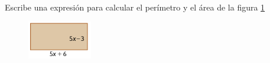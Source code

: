 Escribe una expresión para calcular el perímetro y el área de la figura \ref{fig:20230319044608}

\begin{figure}[H]
    \centering
    \includegraphics[width=0.25\textwidth]{../images/20230319044608}
    \caption{}
    \label{fig:20230319044608}
\end{figure}
